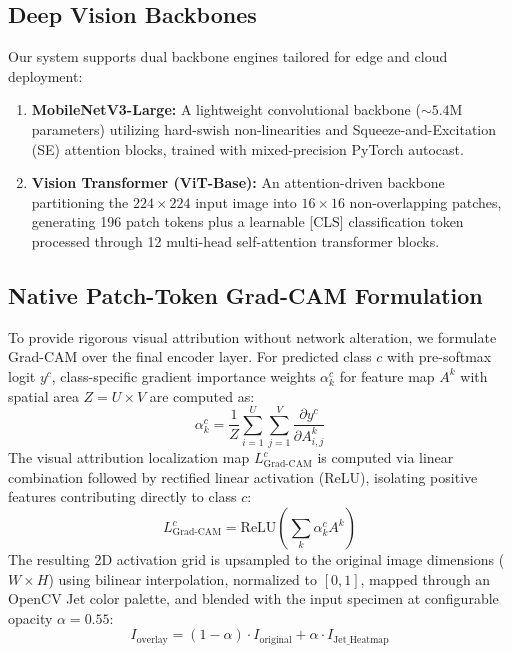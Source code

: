 \documentclass[sn-mathphys,Numbered]{sn-jnl}%
\begin{document}
\subsection{Deep Vision Backbones}
Our system supports dual backbone engines tailored for edge and cloud deployment:
\begin{enumerate}
    \item \textbf{MobileNetV3-Large:} A lightweight convolutional backbone ($\sim 5.4$M parameters) utilizing hard-swish non-linearities and Squeeze-and-Excitation (SE) attention blocks, trained with mixed-precision PyTorch autocast.
    \item \textbf{Vision Transformer (ViT-Base):} An attention-driven backbone partitioning the $224 \times 224$ input image into $16 \times 16$ non-overlapping patches, generating 196 patch tokens plus a learnable [CLS] classification token processed through 12 multi-head self-attention transformer blocks.
\end{enumerate}

\subsection{Native Patch-Token Grad-CAM Formulation}
To provide rigorous visual attribution without network alteration, we formulate Grad-CAM over the final encoder layer. For predicted class $c$ with pre-softmax logit $y^c$, class-specific gradient importance weights $\alpha_k^c$ for feature map $A^k$ with spatial area $Z = U \times V$ are computed as:
\begin{equation}
\alpha_k^c = \frac{1}{Z} \sum_{i=1}^U \sum_{j=1}^V \frac{\partial y^c}{\partial A_{i,j}^k}
\end{equation}
The visual attribution localization map $L_{\text{Grad-CAM}}^c$ is computed via linear combination followed by rectified linear activation (ReLU), isolating positive features contributing directly to class $c$:
\begin{equation}
L_{\text{Grad-CAM}}^c = \text{ReLU}\left( \sum_k \alpha_k^c A^k \right)
\end{equation}
The resulting 2D activation grid is upsampled to the original image dimensions ($W \times H$) using bilinear interpolation, normalized to $[0, 1]$, mapped through an OpenCV Jet color palette, and blended with the input specimen at configurable opacity $\alpha = 0.55$:
\begin{equation}
I_{\text{overlay}} = (1 - \alpha) \cdot I_{\text{original}} + \alpha \cdot I_{\text{Jet\_Heatmap}}
\end{equation}
\end{document}
